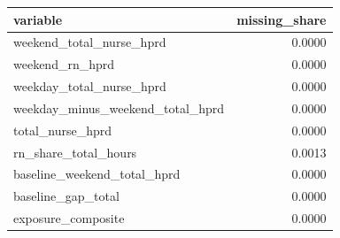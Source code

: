 \begin{tabular}{lr}
\toprule
variable & missing_share \\
\midrule
weekend_total_nurse_hprd & 0.0000 \\
weekend_rn_hprd & 0.0000 \\
weekday_total_nurse_hprd & 0.0000 \\
weekday_minus_weekend_total_hprd & 0.0000 \\
total_nurse_hprd & 0.0000 \\
rn_share_total_hours & 0.0013 \\
baseline_weekend_total_hprd & 0.0000 \\
baseline_gap_total & 0.0000 \\
exposure_composite & 0.0000 \\
\bottomrule
\end{tabular}
